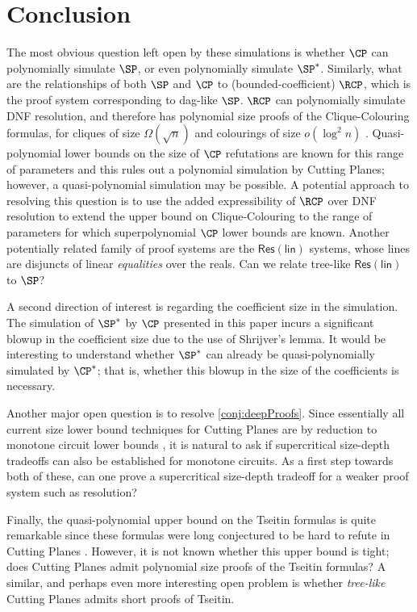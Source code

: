 \documentclass{toc}
\begin{document}
\section{Conclusion}
The most obvious question left open by these simulations is whether $\CP$ can polynomially simulate $\SP$, or even polynomially simulate $\SP^*$. 
Similarly, what are the relationships of both $\SP$ and $\CP$ to (bounded-coefficient) $\RCP$, which is the proof system corresponding to dag-like $\SP$. 
$\RCP$ can polynomially simulate DNF resolution, and therefore has polynomial size proofs of the Clique-Colouring formulas, for cliques of size $\Omega(\sqrt{n})$ and colourings of size $o(\log^2 n)$ \cite{AtseriasBE02}. 
Quasi-polynomial lower bounds on the size of $\CP$ refutations are known for this range of parameters and this rules out a polynomial simulation by Cutting Planes; however, a quasi-polynomial simulation may be possible. A potential approach to resolving this question is to use the added expressibility of $\RCP$ over DNF resolution to extend the upper bound on Clique-Colouring to the range of parameters for which superpolynomial $\CP$ lower bounds are known.
Another potentially related family of proof systems are the $\mathsf{Res(lin)}$ systems, whose lines are disjuncts of linear \emph{equalities} over the reals.
Can we relate tree-like $\mathsf{Res(lin)}$ to $\SP$?

A second direction of interest is regarding the coefficient size in the simulation. The simulation of $\SP^*$ by $\CP$ presented in this paper incurs a significant blowup in the coefficient size due to the use of Shrijver's lemma. It would be interesting to understand whether $\SP^*$ can already be quasi-polynomially simulated by $\CP^*$; that is, whether this blowup in the size of the coefficients is necessary.

Another major open question is to resolve \autoref{conj:deepProofs}. Since essentially all current size lower bound techniques for Cutting Planes are by reduction to monotone circuit lower bounds \cite{Pudlak97, FlemingPPR17,HrubesP17,GargGKS18}, it is natural to ask if supercritical size-depth tradeoffs can also be established for monotone circuits. As a first step towards both of these, can one prove a supercritical size-depth tradeoff for a weaker proof system such as resolution?

Finally, the quasi-polynomial upper bound on the Tseitin formulas \cite{TseitinUpperBound} is quite remarkable since these formulas were long conjectured to be hard to refute in Cutting Planes \cite{CookCT87}. However, it is not known whether this upper bound is tight; does Cutting Planes admit polynomial size proofs of the Tseitin formulas? A similar, and perhaps even more interesting open problem is whether \emph{tree-like} Cutting Planes admits short proofs of Tseitin. 
\end{document}
